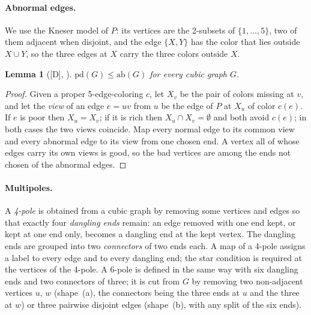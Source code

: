 \documentclass[11pt]{article}
\newtheorem{lemma}[theorem]{Lemma}
\theoremstyle{definition}
\theoremstyle{remark}
\newcommand{\PG}{P}
\newcommand{\pd}{\mathrm{pd}}
\newcommand{\ab}{\mathrm{ab}}
\newcommand{\claim}[1]{\textup{[#1]}}
\begin{document}
\paragraph{Abnormal edges.} We use the Kneser model of $\PG$: its vertices are the 2-subsets of
$\{1, \dots, 5\}$, two of them adjacent when disjoint, and the edge $\{X, Y\}$ has the color that
lies outside $X \cup Y$, so the three edges at $X$ carry the three colors outside $X$.

\begin{lemma}[\claim{D}, \cite{Audit2026}]\label{lem:pdab}
$\pd(G) \le \ab(G)$ for every cubic graph $G$.
\end{lemma}

\begin{proof}
Given a proper 5-edge-coloring $c$, let $X_v$ be the pair of colors missing at $v$, and let the
\emph{view} of an edge $e = uv$ from $u$ be the edge of $\PG$ at $X_u$ of color $c(e)$. If $e$ is
poor then $X_u = X_v$; if it is rich then $X_u \cap X_v = \emptyset$ and both avoid $c(e)$; in both
cases the two views coincide. Map every normal edge to its common view and every abnormal edge to
its view from one chosen end. A vertex all of whose edges carry its own views is good, so the bad
vertices are among the ends not chosen of the abnormal edges.
\end{proof}

\paragraph{Multipoles.} A \emph{4-pole} is obtained from a cubic graph by removing some vertices
and edges so that exactly four \emph{dangling ends} remain: an edge removed with one end kept, or
kept at one end only, becomes a dangling end at the kept vertex. The dangling ends are grouped into
two \emph{connectors} of two ends each. A map of a 4-pole assigns a label to every edge and to
every dangling end; the star condition is required at the vertices of the 4-pole. A 6-pole is
defined in the same way with six dangling ends and two connectors of three; it is cut from $G$ by
removing two non-adjacent vertices $u$, $w$ (shape~(a), the connectors being the three ends at $u$
and the three at $w$) or three pairwise disjoint edges (shape~(b), with any split of the six ends).
\end{document}
